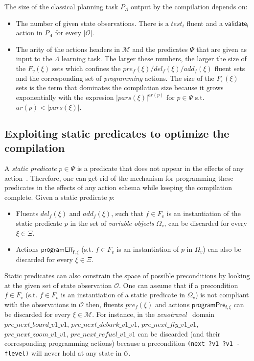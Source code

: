 \documentclass[3p,times]{elsarticle}
\begin{document}
The size of the classical planning task $P_{\Lambda}$ output by the compilation depends on:
\begin{itemize}
\item The number of given state observations. There is a $test_i$ fluent and a $\mathsf{validate_{i}}$ action in $P_{\Lambda}$ for every $|\mathcal{O}|$.
\item The arity of the actions headers in $\mathcal{M}$ and the predicates $\Psi$ that are given as input to the $\Lambda$ learning task. The larger these numbers, the larger the size of the $F_v(\xi)$ sets which confines the $pre_f(\xi)/del_f(\xi)/add_f(\xi)$ fluent sets and the corresponding set of {\em programming} actions. The size of the $F_v(\xi)$ sets is the term that dominates the compilation size because it grows exponentially with the expresion $|pars(\xi)|^{ar(p)}$ for $p\in\Psi$ s.t. $ar(p)<|pars(\xi)|$.
\end{itemize}



\subsection{Exploiting static predicates to optimize the compilation}
A {\em static predicate} $p \in \Psi$ is a predicate that does not appear in the effects of any action~\cite{fox:TIM:JAIR1998}. Therefore, one can get rid of the mechanism for programming these predicates in the effects of any action schema while keeping the compilation complete. Given a static predicate $p$:
\begin{itemize}
\item Fluents $del_f(\xi)$ and $add_f(\xi)$, such that $f\in F_v$ is an instantiation of the static predicate $p$ in the set of {\em variable objects} $\Omega_v$, can be discarded for every $\xi\in\Xi$.
\item Actions $\mathsf{programEff_{f,\xi}}$ (s.t. $f\in F_v$ is an instantiation of $p$ in $\Omega_v$) can also be discarded for every $\xi\in\Xi$.
\end{itemize}

Static predicates can also constrain the space of possible preconditions by looking at the given set of state observation $\mathcal{O}$. One can assume that if a precondition $f\in F_v$ (s.t. $f\in F_v$ is an instantiation of a static predicate in $\Omega_v$) is not compliant with the observations in $\mathcal{O}$ then, fluents $pre_f(\xi)$ and actions $\mathsf{programPre_{f,\xi}}$ can be discarded for every $\xi\in\mathcal{M}$. For instance, in the {\em zenotravel}~\cite{long20033rd} domain $pre\_next\_board\_v1\_v1$, $pre\_next\_debark\_v1\_v1$, $pre\_next\_fly\_v1\_v1$, $pre\_next\_zoom\_v1\_v1$, $pre\_next\_refuel\_v1\_v1$ can be discarded (and their corresponding programming actions) because a precondition {\tt\small(next ?v1 ?v1 - flevel)} will never hold at any state in $\mathcal{O}$.
\end{document}
